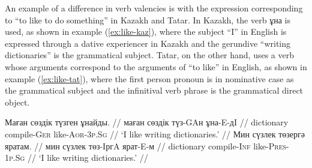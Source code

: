 \documentclass[a4paper,11pt]{article}
\newcommand{\gmk}[1]{{\qipb\scshape #1}}
\newcommand{\eng}[1]{`#1'}
\begin{document}



An example of a difference in verb valencies is with the expression corresponding 
to ``to like to do something'' in Kazakh and Tatar.  In Kazakh, the verb ұна is used, as shown in 
example (\ref{ex:like-kaz}), where the subject ``I'' in English is expressed through a dative 
experiencer in Kazakh and the gerundive ``writing dictionaries'' is the grammatical subject.  Tatar, on the 
other hand, uses a verb whose arguments correspond to the arguments of ``to like'' in English, as 
shown in example (\ref{ex:like-tat}), where the first person pronoun is in nominative case as 
the grammatical subject and the infinitival verb phrase is the grammatical direct object.


\pex[everygla=,everyglb=,everyglc=\small,aboveglbskip=0pt,aboveglftskip=0ex]  %
\vspace{-1ex}
\label{ex:like-kaz}
\begingl
\gla Маған сөздік түзген ұнайды. //
\glb маған сөздік түз-GAн ұна-E-дI //
\glc \gmk{1p.Sg.Dat} dictionary compile-\gmk{Ger} like-\gmk{Aor}-\gmk{3p.Sg} //
\glft \eng{I like writing dictionaries.} //
\endgl
\xe
\pex[everygla=,everyglb=,everyglc=,aboveglbskip=0pt,aboveglftskip=0ex]  %
\vspace{-1ex}
\label{ex:like-tat}
\begingl
\gla Мин сүзлек төзергә яратам. //
\glb мин сүзлек төз-IргA ярат-E-м //
\glc \gmk{1p.Sg} dictionary compile-\gmk{Inf} like-\gmk{Pres}-\gmk{1p.Sg} //
\glft \eng{I like writing dictionaries.} //
\endgl
\xe
\end{document}
